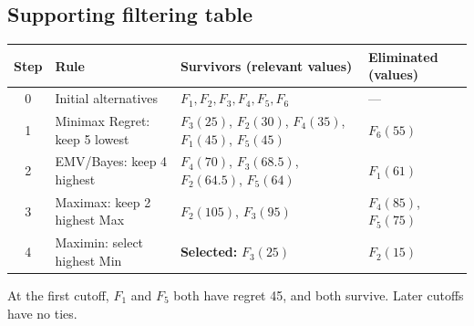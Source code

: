 \subsection*{Supporting filtering table}
\begin{center}\small
\begin{tabularx}{\textwidth}{@{}c >{\raggedright\arraybackslash}p{} >{\raggedright\arraybackslash}X >{\raggedright\arraybackslash}p{}@{}}
\toprule
Step & Rule & Survivors (relevant values) & Eliminated (values)\\\midrule
0 & Initial alternatives & $F_1,F_2,F_3,F_4,F_5,F_6$ & ---\\
1 & Minimax Regret: keep 5 lowest & $F_3(25)$, $F_2(30)$, $F_4(35)$, $F_1(45)$, $F_5(45)$ & $F_6(55)$\\
2 & EMV/Bayes: keep 4 highest & $F_4(70)$, $F_3(68.5)$, $F_2(64.5)$, $F_5(64)$ & $F_1(61)$\\
3 & Maximax: keep 2 highest Max & $F_2(105)$, $F_3(95)$ & $F_4(85)$, $F_5(75)$\\
4 & Maximin: select highest Min & \textbf{Selected:} $F_3(25)$ & $F_2(15)$\\
\bottomrule\end{tabularx}
\end{center}
At the first cutoff, $F_1$ and $F_5$ both have regret 45, and both survive. Later cutoffs have no ties.
\secInicio[sec:q4]

\label{sol:q4tree}
